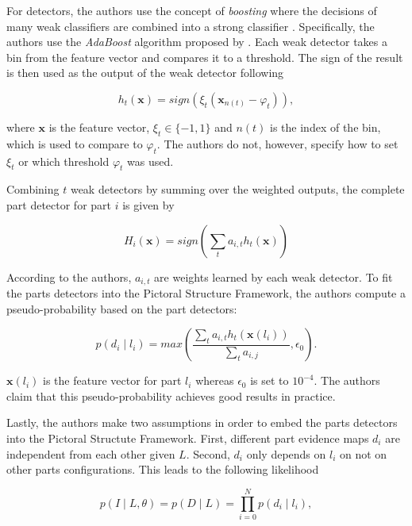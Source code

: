 For detectors, the authors use the concept of \textit{boosting} where the decisions of many weak classifiers are combined into a strong classifier \cite{freund_short_1999}.
Specifically, the authors use the \textit{AdaBoost} algorithm proposed by \cite{freund_decision-theoretic_1997}.
Each weak detector takes a bin from the feature vector and compares it to a threshold.
The sign of the result is then used as the output of the weak detector following

\begin{equation}
    h_t(\bm{x}) = sign(\xi_t (\bm{x}_{n(t)} - \varphi_t )),
\end{equation}

where $\bm{x}$ is the feature vector, $\xi_t \in \{-1, 1\}$ and $n(t)$ is the index of the bin, which is used to compare to $\varphi_t$.
The authors do not, however, specify how to set $\xi_t$ or which threshold $\varphi_t$ was used.

Combining $t$ weak detectors by summing over the weighted outputs, the complete part detector for part $i$ is given by 

\begin{equation}
    H_i(\bm{x}) = sign\left(\sum_t a_{i,t} h_t(\bm{x})\right)
\end{equation}

According to the authors, $a_{i,t}$ are weights learned by each weak detector.
To fit the parts detectors into the Pictoral Structure Framework, the authors compute a pseudo-probability based on the part detectors:

\begin{equation}
    p(d_i \mid l_i) = max \left(\frac{\sum_t a_{i,t} h_t(\bm{x}(l_i))}{\sum_t a_{i,j}}, \epsilon_0 \right).
\end{equation}

$\bm{x}(l_i)$ is the feature vector for part $l_i$ whereas $\epsilon_0$ is set to $10^{-4}$.
The authors claim that this pseudo-probability achieves good results in practice.

Lastly, the authors make two assumptions in order to embed the parts detectors into the Pictoral Structute Framework.
First, different part evidence maps $d_i$ are independent from each other given $L$.
Second, $d_i$ only depends on $l_i$ on not on other parts configurations.
This leads to the following likelihood

\begin{equation}
    p(I \mid L, \theta) = p(D \mid L) = \prod_{i=0}^N p(d_i \mid l_i),
\end{equation}

